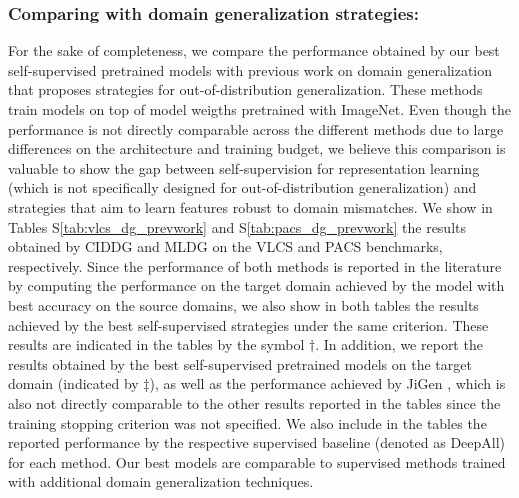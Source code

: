 \documentclass[runningheads]{llncs}
\begin{document}
\subsubsection*{Comparing with domain generalization strategies:} For the sake of completeness, we compare the performance obtained by our best self-supervised pretrained models with previous work on domain generalization that proposes strategies for out-of-distribution generalization. These methods train models on top of model weigths pretrained with ImageNet. Even though the performance is not directly comparable across the different methods due to large differences on the architecture and training budget, we believe this comparison is valuable to show the gap between self-supervision for representation learning (which is not specifically designed for out-of-distribution generalization) and strategies that aim  to learn features robust to domain mismatches. We show in Tables S\ref{tab:vlcs_dg_prevwork} and  S\ref{tab:pacs_dg_prevwork} the results obtained by CIDDG \cite{li2018domain} and MLDG \cite{li2018learning} on the VLCS and PACS benchmarks, respectively. Since the  performance of both methods is reported in the literature by computing the performance on the target domain achieved by the model with best accuracy on the source domains, we also show in both tables the results achieved by the best self-supervised strategies under the same criterion. These results are indicated in the tables by the symbol $\dagger$. In addition, we  report the results obtained by the best self-supervised pretrained models on the target domain (indicated by $\ddagger$), as well as the performance achieved by JiGen \cite{carlucci2019domain}, which is also not directly comparable to the other results reported in the tables since the training stopping criterion was not specified. We also include in the tables the reported performance by the respective supervised baseline (denoted as DeepAll) for each method. Our best models are comparable to supervised methods trained with additional domain generalization techniques. 
\end{document}
